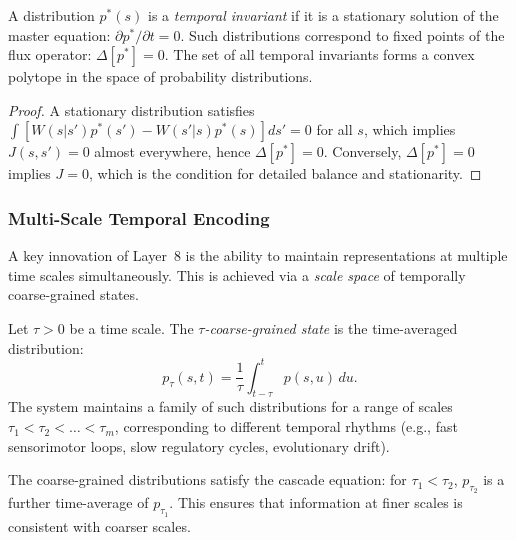 \begin{proposition}
A distribution $p^*(s)$ is a \emph{temporal invariant} if it is a stationary solution of the master equation: $\partial p^* / \partial t = 0$. Such distributions correspond to fixed points of the flux operator: $\Delta[p^*] = 0$. The set of all temporal invariants forms a convex polytope in the space of probability distributions.
\end{proposition}
\begin{proof}
A stationary distribution satisfies $\int [W(s|s') p^*(s') - W(s'|s) p^*(s)] ds' = 0$ for all $s$, which implies $J(s,s')=0$ almost everywhere, hence $\Delta[p^*]=0$. Conversely, $\Delta[p^*]=0$ implies $J=0$, which is the condition for detailed balance and stationarity.
\end{proof}

\subsubsection{Multi-Scale Temporal Encoding}
A key innovation of Layer~8 is the ability to maintain representations at multiple time scales simultaneously. This is achieved via a \emph{scale space} of temporally coarse-grained states.

\begin{definition}
Let $\tau > 0$ be a time scale. The \emph{$\tau$-coarse-grained state} is the time-averaged distribution:
\[
p_\tau(s, t) = \frac{1}{\tau} \int_{t-\tau}^t p(s, u) \, du.
\]
The system maintains a family of such distributions for a range of scales $\tau_1 < \tau_2 < \dots < \tau_m$, corresponding to different temporal rhythms (e.g., fast sensorimotor loops, slow regulatory cycles, evolutionary drift).
\end{definition}

\begin{lemma}
The coarse-grained distributions satisfy the cascade equation: for $\tau_1 < \tau_2$, $p_{\tau_2}$ is a further time-average of $p_{\tau_1}$. This ensures that information at finer scales is consistent with coarser scales.
\end{lemma}

